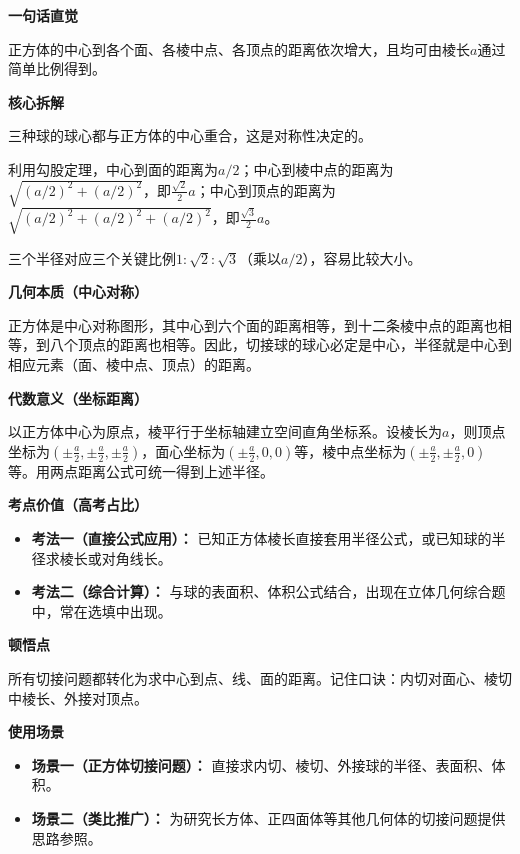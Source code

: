 \begin{explanationbox}

	\textbf{\textcolor{CExplanation}{一句话直觉}}

	正方体的中心到各个面、各棱中点、各顶点的距离依次增大，且均可由棱长$a$通过简单比例得到。

	\medskip
	\textbf{\textcolor{CExplanation}{核心拆解}}
	\begin{description}[style=nextline, leftmargin=2.8em, labelsep=0.5em, itemsep=0.45em]
		\item[\textbf{要点一（球心位置）：}] 三种球的球心都与正方体的中心重合，这是对称性决定的。
		\item[\textbf{要点二（距离计算）：}] 利用勾股定理，中心到面的距离为$a/2$；中心到棱中点的距离为$\sqrt{(a/2)^2+(a/2)^2}$，即$\frac{\sqrt{2}}{2}a$；中心到顶点的距离为$\sqrt{(a/2)^2+(a/2)^2+(a/2)^2}$，即$\frac{\sqrt{3}}{2}a$。
		\item[\textbf{要点三（比例系数）：}] 三个半径对应三个关键比例$1: \sqrt{2}: \sqrt{3}$（乘以$a/2$），容易比较大小。
	\end{description}

	\medskip
	\textbf{\textcolor{CExplanation}{几何本质（中心对称）}}

	正方体是中心对称图形，其中心到六个面的距离相等，到十二条棱中点的距离也相等，到八个顶点的距离也相等。因此，切接球的球心必定是中心，半径就是中心到相应元素（面、棱中点、顶点）的距离。

	\medskip
	\textbf{\textcolor{CExplanation}{代数意义（坐标距离）}}

	以正方体中心为原点，棱平行于坐标轴建立空间直角坐标系。设棱长为$a$，则顶点坐标为$(\pm \frac{a}{2}, \pm \frac{a}{2}, \pm \frac{a}{2})$，面心坐标为$(\pm \frac{a}{2}, 0, 0)$等，棱中点坐标为$(\pm \frac{a}{2}, \pm \frac{a}{2}, 0)$等。用两点距离公式可统一得到上述半径。

	\medskip
	\textbf{\textcolor{CExplanation}{考点价值（高考占比）}}
	\begin{itemize}[leftmargin=*, itemsep=0.5em, topsep=0.4em]
		\item \textbf{考法一（直接公式应用）：} 已知正方体棱长直接套用半径公式，或已知球的半径求棱长或对角线长。
		\item \textbf{考法二（综合计算）：} 与球的表面积、体积公式结合，出现在立体几何综合题中，常在选填中出现。
	\end{itemize}

	\medskip
	\textbf{\textcolor{CExplanation}{顿悟点}}

	所有切接问题都转化为求中心到点、线、面的距离。记住口诀：内切对面心、棱切中棱长、外接对顶点。

	\medskip
	\textbf{\textcolor{CExplanation}{使用场景}}
	\begin{itemize}[leftmargin=*, itemsep=0.5em, topsep=0.4em]
		\item \textbf{场景一（正方体切接问题）：} 直接求内切、棱切、外接球的半径、表面积、体积。
		\item \textbf{场景二（类比推广）：} 为研究长方体、正四面体等其他几何体的切接问题提供思路参照。
	\end{itemize}

\end{explanationbox}
